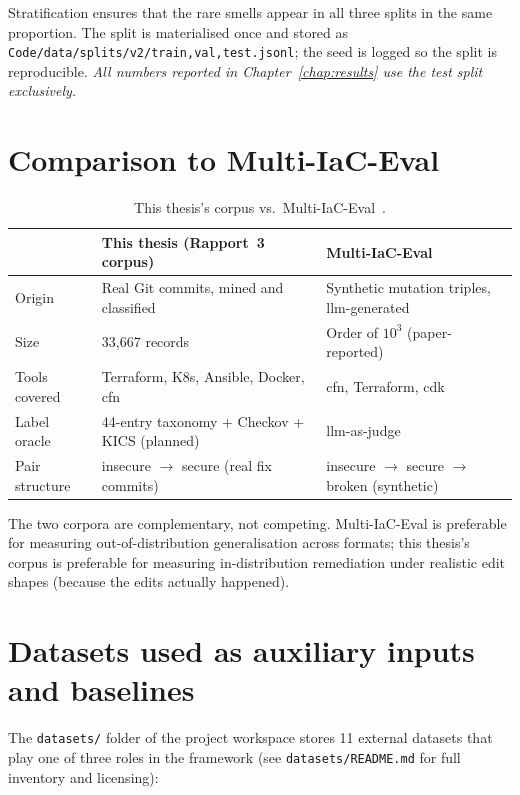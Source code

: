 \documentclass[12pt, a4paper]{report}
\begin{document}
Stratification ensures that the rare smells appear in all three splits in
the same proportion. The split is materialised once and stored as
\texttt{Code/data/splits/v2/{train,val,test}.jsonl}; the seed is logged so
the split is reproducible. \emph{All numbers reported in
Chapter~\ref{chap:results} use the test split exclusively.}

\section{Comparison to Multi-IaC-Eval}

\begin{table}[H]
  \centering
  \caption{This thesis's corpus vs.\ Multi-IaC-Eval~\citep{multi2025iaceval}.}
  \label{tab:vsmultieval}
  \small
  \begin{tabularx}{\linewidth}{lXX}
    \toprule
     & \textbf{This thesis (Rapport~3 corpus)} & \textbf{Multi-IaC-Eval} \\
    \midrule
    Origin           & Real Git commits, mined and classified
                     & Synthetic mutation triples, \gls{llm}-generated \\
    Size             & 33{,}667 records & Order of $10^3$ (paper-reported) \\
    Tools covered    & Terraform, K8s, Ansible, Docker, \gls{cfn}
                     & \gls{cfn}, Terraform, \gls{cdk} \\
    Label oracle     & 44-entry taxonomy + Checkov + KICS (planned)
                     & \gls{llm}-as-judge \\
    Pair structure   & insecure $\to$ secure (real fix commits)
                     & insecure $\to$ secure $\to$ broken (synthetic) \\
    \bottomrule
  \end{tabularx}
\end{table}

The two corpora are complementary, not competing. Multi-IaC-Eval is
preferable for measuring out-of-distribution generalisation across formats;
this thesis's corpus is preferable for measuring in-distribution remediation
under realistic edit shapes (because the edits actually happened).

\section{Datasets used as auxiliary inputs and baselines}

The \texttt{datasets/} folder of the project workspace stores 11 external
datasets that play one of three roles in the framework
(see \texttt{datasets/README.md} for full inventory and licensing):
\end{document}
